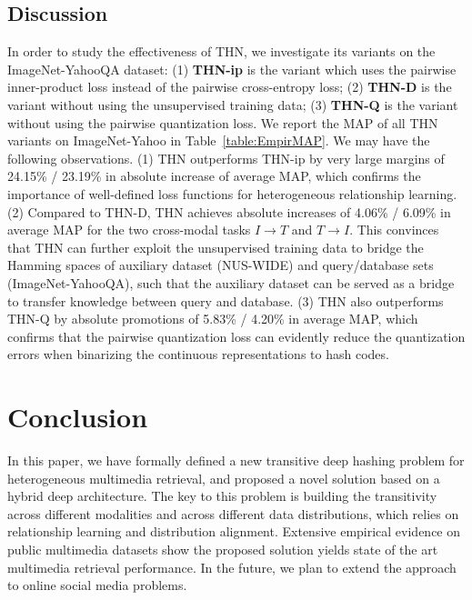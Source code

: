 \documentclass{article}
\begin{document}
\subsection{Discussion}
In order to study the effectiveness of THN, we investigate its variants on the ImageNet-YahooQA dataset: (1) \textbf{THN-ip} is the variant which uses the pairwise inner-product loss instead of the pairwise cross-entropy loss; (2) \textbf{THN-D} is the variant without using the unsupervised training data; (3) \textbf{THN-Q} is the variant without using the pairwise quantization loss. We report the MAP of all THN variants on ImageNet-Yahoo in Table~\ref{table:EmpirMAP}. We may have the following observations. (1) THN outperforms THN-ip by very large margins of 24.15\% / 23.19\% in absolute increase of average MAP, which confirms the importance of well-defined loss functions for heterogeneous relationship learning. (2) Compared to THN-D, THN achieves absolute increases of 4.06\% / 6.09\% in average MAP for the two cross-modal tasks $I \to T$ and $T \to I$. This convinces that THN can further exploit the unsupervised training data to bridge the Hamming spaces of auxiliary dataset (NUS-WIDE) and query/database sets (ImageNet-YahooQA), such that the auxiliary dataset can be served as a bridge to transfer knowledge between query and database. (3) THN also outperforms THN-Q by absolute promotions of 5.83\% / 4.20\% in average MAP, which confirms that the pairwise quantization loss can evidently reduce the quantization errors when binarizing the continuous representations to hash codes.

\section{Conclusion}
In this paper, we have formally defined a new transitive deep hashing problem for heterogeneous multimedia retrieval, and proposed a novel solution based on a hybrid deep architecture. The key to this problem is building the transitivity across different modalities and across different data distributions, which relies on relationship learning and distribution alignment. Extensive empirical evidence on public multimedia datasets show the proposed solution yields state of the art multimedia retrieval performance. In the future, we plan to extend the approach to online social media problems.

\medskip
\end{document}
